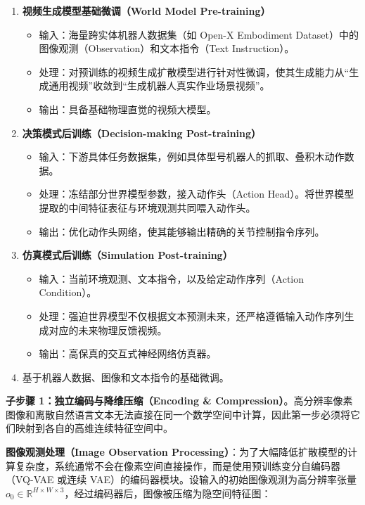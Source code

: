 \begin{enumerate}
\def\labelenumi{\arabic{enumi}.}
\tightlist
\item
  \textbf{视频生成模型基础微调（World Model Pre-training）}

  \begin{itemize}
  \tightlist
  \item
    输入：海量跨实体机器人数据集（如 Open-X Embodiment Dataset）中的图像观测（Observation）和文本指令（Text Instruction）。
  \item
    处理：对预训练的视频生成扩散模型进行针对性微调，使其生成能力从``生成通用视频''收敛到``生成机器人真实作业场景视频''。
  \item
    输出：具备基础物理直觉的视频大模型。
  \end{itemize}
\item
  \textbf{决策模式后训练（Decision-making Post-training）}

  \begin{itemize}
  \tightlist
  \item
    输入：下游具体任务数据集，例如具体型号机器人的抓取、叠积木动作数据。
  \item
    处理：冻结部分世界模型参数，接入动作头（Action Head）。将世界模型提取的中间特征表征与环境观测共同喂入动作头。
  \item
    输出：优化动作头网络，使其能够输出精确的关节控制指令序列。
  \end{itemize}
\item
  \textbf{仿真模式后训练（Simulation Post-training）}

  \begin{itemize}
  \tightlist
  \item
    输入：当前环境观测、文本指令，以及给定动作序列（Action Condition）。
  \item
    处理：强迫世界模型不仅根据文本预测未来，还严格遵循输入动作序列生成对应的未来物理反馈视频。
  \item
    输出：高保真的交互式神经网络仿真器。
  \end{itemize}
\item
  基于机器人数据、图像和文本指令的基础微调。
\end{enumerate}

\textbf{子步骤 1：独立编码与降维压缩（Encoding \& Compression）}。高分辨率像素图像和离散自然语言文本无法直接在同一个数学空间中计算，因此第一步必须将它们映射到各自的高维连续特征空间中。

\textbf{图像观测处理（Image Observation Processing）}：为了大幅降低扩散模型的计算复杂度，系统通常不会在像素空间直接操作，而是使用预训练变分自编码器（VQ-VAE 或连续 VAE）的编码器模块。设输入的初始图像观测为高分辨率张量 \(o_0 \in \mathbb{R}^{H \times W \times 3}\)，经过编码器后，图像被压缩为隐空间特征图：

